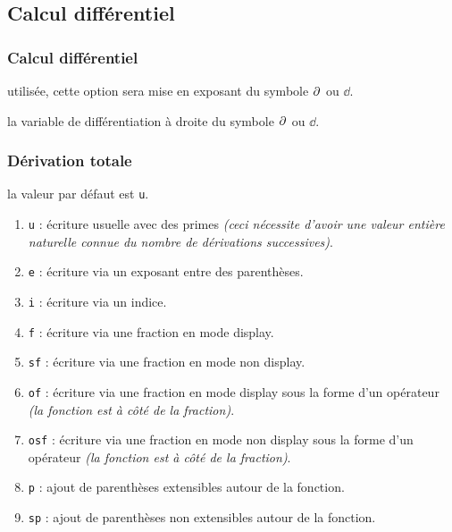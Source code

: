 \documentclass[12pt,a4paper]{article}
\theoremstyle{definition}
\begin{document}
\subsection{Calcul différentiel}

\subsubsection{Calcul différentiel}



\IDoption{} utilisée, cette option sera mise en exposant du symbole $\pp{}$ ou $\dd{}$.

\IDarg{} la variable de différentiation à droite du symbole $\pp{}$ ou $\dd{}$.





\subsubsection{Dérivation totale}


\IDoption{} la valeur par défaut est \verb+u+. 
\begin{enumerate}
	\item \verb+u+ : écriture usuelle avec des primes \emph{(ceci nécessite d'avoir une valeur entière naturelle connue du nombre de dérivations successives)}.

	\item \verb+e+ : écriture via un exposant entre des parenthèses.
	
	\item \verb+i+ : écriture via un indice.

	\item \verb+f+ : écriture via une fraction en mode display.

	\item \verb+sf+ : écriture via une fraction en mode non display.

	\item \verb+of+ : écriture via une fraction en mode display sous la forme d'un opérateur \emph{(la fonction est à côté de la fraction)}.

	\item \verb+osf+ : écriture via une fraction en mode non display sous la forme d'un opérateur \emph{(la fonction est à côté de la fraction)}.

	\smallskip
	\item \verb+p+ : ajout de parenthèses extensibles autour de la fonction.

	\item \verb+sp+ : ajout de parenthèses non extensibles autour de la fonction.
\end{enumerate}
\end{document}
